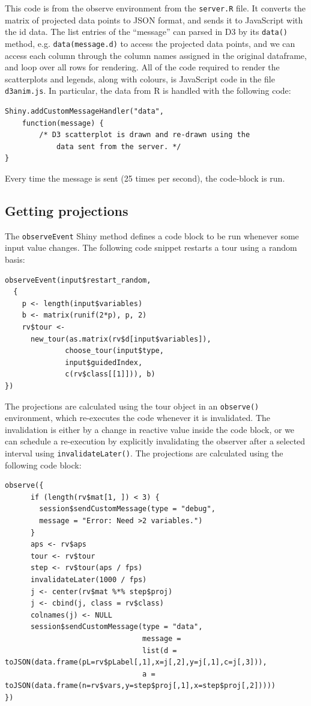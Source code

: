 This code is from the observe environment from the \texttt{server.R}
file. It converts the matrix of projected data points to JSON format,
and sends it to JavaScript with the id data. The list entries of the
``message'' can parsed in D3 by its \texttt{data()} method, e.g.
\texttt{data(message.d)} to access the projected data points, and we can
access each column through the column names assigned in the original
dataframe, and loop over all rows for rendering. All of the code
required to render the scatterplots and legends, along with colours, is
JavaScript code in the file \texttt{d3anim.js}. In particular, the data
from R is handled with the following code:

\begin{verbatim}
Shiny.addCustomMessageHandler("data",
    function(message) {
        /* D3 scatterplot is drawn and re-drawn using the
            data sent from the server. */
}
\end{verbatim}

Every time the message is sent (25 times per second), the code-block is
run.

\hypertarget{getting-projections}{%
\subsection{Getting projections}\label{getting-projections}}

The \texttt{observeEvent} Shiny method defines a code block to be run
whenever some input value changes. The following code snippet restarts a
tour using a random basis:

\begin{verbatim}
observeEvent(input$restart_random,
  {
    p <- length(input$variables)
    b <- matrix(runif(2*p), p, 2)
    rv$tour <- 
      new_tour(as.matrix(rv$d[input$variables]),
              choose_tour(input$type, 
              input$guidedIndex,
              c(rv$class[[1]])), b)
})
\end{verbatim}

The projections are calculated using the tour object in an
\texttt{observe()} environment, which re-executes the code whenever it
is invalidated. The invalidation is either by a change in reactive value
inside the code block, or we can schedule a re-execution by explicitly
invalidating the observer after a selected interval using
\texttt{invalidateLater()}. The projections are calculated using the
following code block:

\begin{verbatim}
observe({
      if (length(rv$mat[1, ]) < 3) {
        session$sendCustomMessage(type = "debug",
        message = "Error: Need >2 variables.")
      }
      aps <- rv$aps
      tour <- rv$tour
      step <- rv$tour(aps / fps)
      invalidateLater(1000 / fps)
      j <- center(rv$mat %*% step$proj)
      j <- cbind(j, class = rv$class)
      colnames(j) <- NULL
      session$sendCustomMessage(type = "data",
                                message =
                                list(d = toJSON(data.frame(pL=rv$pLabel[,1],x=j[,2],y=j[,1],c=j[,3])),
                                a = toJSON(data.frame(n=rv$vars,y=step$proj[,1],x=step$proj[,2]))))
})
\end{verbatim}

